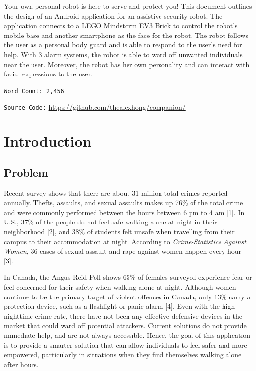 \documentclass[12pt]{article}
\begin{document}

\pagebreak
\tableofcontents
\pagebreak

\vspace*{\fill}
\renewcommand{\abstractname}{Executive Summary}
\abstract
Your own personal robot is here to serve and protect you! This document outlines the design of an Android application for an assistive security robot. The application connects to a LEGO Mindstorm EV3 Brick to control the robot's mobile base and another smartphone as the face for the robot. The robot follows the user as a personal body guard and is able to respond to the user's need for help. With 3 alarm systems, the robot is able to ward off unwanted individuals near the user. Moreover, the robot has her own personality and can interact with facial expressions to the user.
\vfill
\begin{center}\texttt{\LARGE Word Count: 2,456}\end{center}
\begin{center}
\texttt{Source Code:} \url{https://github.com/thealexhong/companion/}
\end{center}
\vspace*{\fill}
\pagebreak

\section{Introduction}
\subsection{Problem}
Recent survey shows that there are about 31 million total crimes reported annually. Thefts, assaults, and sexual assaults makes up 76\% of the total crime and were commonly performed between the hours between 6 pm to 4 am [1]. In U.S., 37\% of the people do not feel safe walking alone at night in their neighborhood [2], and 38\% of students felt unsafe when travelling from their campus to their accommodation at night. According to \textit{Crime-Statistics Against Women}, 36 cases of sexual assault and rape against women happen every hour [3]. 

In Canada, the Angus Reid Poll shows 65\% of females surveyed experience fear or feel concerned for their safety when walking alone at night. Although women continue to be the primary target of violent offences in Canada, only 13\% carry a protection device, such as a flashlight or panic alarm [4]. Even with the high nighttime crime rate, there have not been any effective defensive devices in the market that could ward off potential attackers. Current solutions do not provide immediate help, and are not always accessible. Hence, the goal of this application is to provide a smarter solution that can allow individuals to feel safer and more empowered, particularly in situations when they find themselves walking alone after hours.
\end{document}
